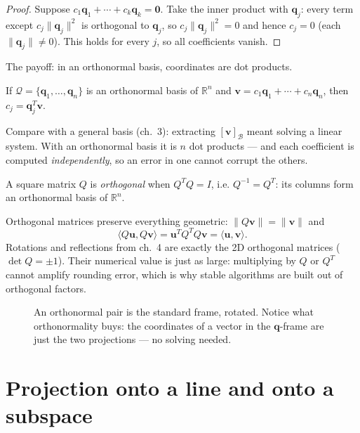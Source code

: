 \begin{proof}
Suppose $c_1\mathbf q_1+\cdots+c_k\mathbf q_k=\mathbf0$. Take the inner product
with $\mathbf q_j$: every term except $c_j\|\mathbf q_j\|^2$ is orthogonal to
$\mathbf q_j$, so $c_j\|\mathbf q_j\|^2=0$ and hence $c_j=0$ (each
$\|\mathbf q_j\|\ne0$). This holds for every $j$, so all coefficients vanish.
\end{proof}

The payoff: in an orthonormal basis, coordinates are dot products.

\begin{theorem}\label{th:orth-coords}
If $\mathcal Q=\{\mathbf q_1,\dots,\mathbf q_n\}$ is an orthonormal basis of
$\mathbb R^n$ and $\mathbf v=c_1\mathbf q_1+\cdots+c_n\mathbf q_n$, then
$c_j=\mathbf q_j^{T}\mathbf v$.
\end{theorem}

Compare with a general basis (ch.~3): extracting $[\mathbf v]_{\mathcal B}$
meant solving a linear system. With an orthonormal basis it is $n$ dot
products --- and each coefficient is computed \emph{independently}, so an
error in one cannot corrupt the others.

\begin{definition}
A square matrix $Q$ is \emph{orthogonal} when $Q^{T}Q=I$, i.e.
$Q^{-1}=Q^{T}$: its columns form an orthonormal basis of $\mathbb R^n$.
\end{definition}

Orthogonal matrices preserve everything geometric:
$\|Q\mathbf v\|=\|\mathbf v\|$ and
\[
\langle Q\mathbf u,Q\mathbf v\rangle
=\mathbf u^{T}Q^{T}Q\mathbf v=\langle\mathbf u,\mathbf v\rangle .
\]
Rotations and reflections from ch.~4 are exactly the 2D orthogonal
matrices ($\det Q=\pm1$). Their numerical value is just as large:
multiplying by $Q$ or $Q^{T}$ cannot amplify rounding error, which is
why stable algorithms are built out of orthogonal factors.

\begin{figure}[htbp]\centering

\caption{An orthonormal pair is the standard frame, rotated. Notice
what orthonormality buys: the coordinates of a vector in the
$\mathbf q$-frame are just the two projections --- no solving needed.}
\label{fig:frame}
\end{figure}

\section{Projection onto a line and onto a subspace}\label{sec:orth-proj}

